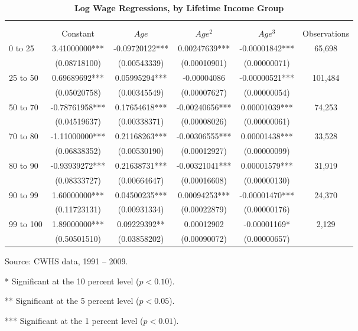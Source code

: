   \begin{table}[htbp] \centering \captionsetup{width=6.0in}
  \caption{\label{tab:wage_profiles}\textbf{Log Wage Regressions, by Lifetime Income Group}}
    \begin{threeparttable}
    \begin{tabular}{>{\scriptsize}l |>{\scriptsize}c >{\scriptsize}c >{\scriptsize}c >{\scriptsize}c |>{\scriptsize}c}
      \hline\hline
      \multicolumn{1}{c}{\scriptsize{Lifetime}} & & & & & \\
      \multicolumn{1}{c}{\scriptsize{income groups}}   & & & & & \\
      \multicolumn{1}{c}{\scriptsize{(percentiles)}} & Constant & $Age$ & $Age^2$ & $Age^3$ & Observations \\
      \hline
      0 to 25 & 3.41000000*** & -0.09720122*** & 0.00247639*** & -0.00001842*** & 65,698 \\
              & (0.08718100) & (0.00543339) & (0.00010901) & (0.00000071) &  \\
      25 to 50 & 0.69689692*** & 0.05995294*** & -0.00004086 & -0.00000521*** & 101,484 \\
            & (0.05020758) & (0.00345549) & (0.00007627) & (0.00000054) &  \\
      50 to 70 & -0.78761958*** & 0.17654618*** & -0.00240656*** & 0.00001039*** & 74,253 \\
               & (0.04519637) & (0.00338371) & (0.00008026) & (0.00000061) &  \\
      70 to 80 & -1.11000000*** & 0.21168263*** & -0.00306555*** & 0.00001438*** & 33,528 \\
            & (0.06838352) & (0.00530190) & (0.00012927) & (0.00000099) &  \\
      80 to 90  & -0.93939272*** & 0.21638731*** & -0.00321041*** & 0.00001579*** & 31,919 \\
            & (0.08333727) & (0.00664647) & (0.00016608) & (0.00000130) &  \\
      90 to 99 & 1.60000000*** & 0.04500235*** & 0.00094253*** & -0.00001470*** & 24,370 \\
            & (0.11723131) & (0.00931334) & (0.00022879) & (0.00000176) &  \\
      99 to 100 & 1.89000000*** & 0.09229392** & 0.00012902 & -0.00001169* & 2,129 \\
            & (0.50501510) & (0.03858202) & (0.00090072) & (0.00000657) &  \\
      \hline\hline
    \end{tabular}
    \begin{tablenotes}
      \scriptsize{\item[]Source: CWHS data, 1991 -- 2009.
      \item[*]Significant at the 10 percent level ($p<0.10$).
      \item[**]Significant at the 5 percent level ($p<0.05$).
      \item[***]Significant at the 1 percent level ($p<0.01$).}
    \end{tablenotes}
    \end{threeparttable}
  \end{table}
